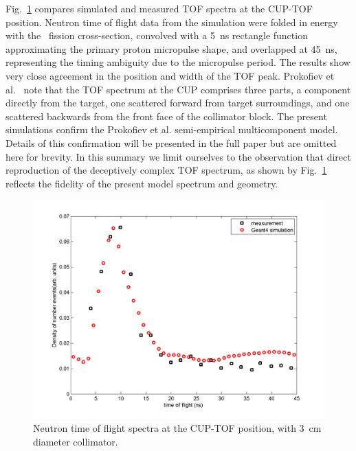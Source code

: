 \documentclass[peerreviewca,11pt,a4paper]{IEEEtran}
\let\MYoriglatexcaption\caption
\renewcommand{\caption}[2][\relax]{\MYoriglatexcaption[#2]{#2}}
\def\U238{\BPChem{\^{238}U}}
\begin{document}
Fig.~\ref{fig:TOFSpectra} compares simulated and measured TOF spectra at the CUP-TOF position.
Neutron time of flight data from the simulation were folded in energy with the \U238\ fission cross-section, convolved with a \SI{5}{\ns} rectangle function approximating the primary proton micropulse shape, and overlapped at \SI{45}{\ns}, representing the timing ambiguity due to the micropulse period.
The results show very close agreement in the position and width of the TOF peak.
Prokofiev et al.~\cite{Prokofiev2014} note that the TOF spectrum at the CUP comprises three parts, a component directly from the target, one scattered forward from target surroundings, and one scattered backwards from the front face of the collimator block.
The present simulations confirm the Prokofiev et al. semi-empirical multicomponent model. Details of this confirmation will be presented in the full paper but are omitted here for brevity.
In this summary we limit ourselves to the observation that direct reproduction of the deceptively complex TOF spectrum, as shown by Fig.~\ref{fig:TOFSpectra} reflects the fidelity of the present model spectrum and geometry.

\begin{figure}[t]
    \centering
    \includegraphics[width=0.9\columnwidth]{CUPTOFtofspectraRADECS.png}
    \caption{
        Neutron time of flight spectra at the CUP-TOF position, with \SI{3}{\cm} diameter collimator.
        }
    \label{fig:TOFSpectra}
\end{figure}
\end{document}
